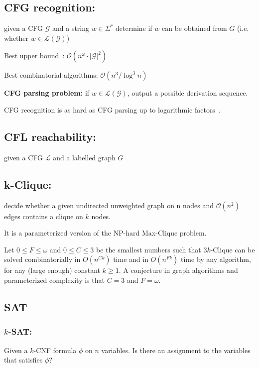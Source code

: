 \documentclass{amsart}
\begin{document}
	\subsection{CFG recognition:}
	
	given a CFG $\mathcal{G}$ and a string $w \in \Sigma^*$ determine if $w$ can be obtained from $G$ (i.e. whether $w \in \mathcal{L}(\mathcal{G})$)
	
	Best upper bound~\cite{valiant1975general}: $\mathcal{O}(n^{\omega} \cdot |\mathcal{G}|^2)$
	
	Best combinatorial algorithms: $\mathcal{O}(n^3 / \log^3 n)$
	
	\textbf{CFG parsing problem:} if $w \in \mathcal{L}(\mathcal{G})$, output a
	possible derivation sequence.
	
	CFG recognition is as hard as CFG parsing up to logarithmic factors~\cite{10.5555/646233.682379}.
	
	\subsection{CFL reachability:}
	
	given a CFG $\mathcal{L}$ and a labelled graph $G$
	
	\subsection{k-Clique:}
	
	decide whether a given undirected unweighted graph on n nodes and $\mathcal{O}(n^2)$ edges contains a clique on $k$ nodes.
	
	It is a parameterized version of the NP-hard Max-Clique problem.
	
	Let $0 \leq F \leq \omega$ and $0 \leq C \leq 3$ be the smallest numbers such that $3k$-Clique can be solved combinatorially in $O(n^{Ck})$ time and in $O(n^{Fk})$ time by any algorithm, for any (large enough) constant $k \geq 1$. A conjecture in graph algorithms and parameterized complexity is that $C = 3$ and $F = \omega$.
	
	\subsection{SAT}
	
	\subsubsection{$k$-SAT:}
	
	Given a $k$-CNF formula $\phi$ on $n$ variables. Is there an assignment to the variables that satisfies $\phi$?
	
\end{document}

